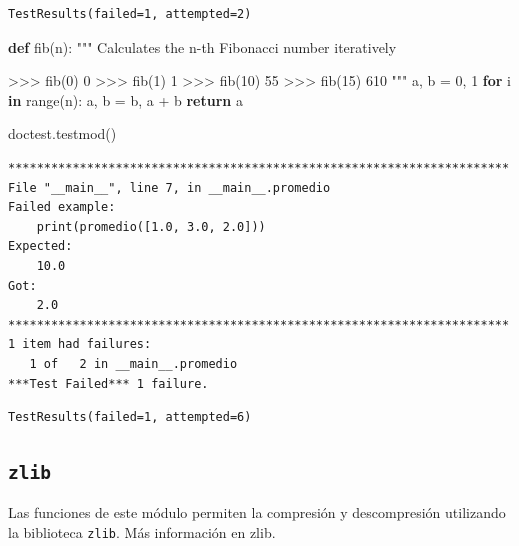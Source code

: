 \documentclass[
  spanish,
  letterpaper,
]{scrbook}
\newenvironment{Shaded}{\begin{snugshade}}{\end{snugshade}}
\newcommand{\BuiltInTok}[1]{\textcolor[rgb]{0.00,0.23,0.31}{#1}}
\newcommand{\CommentTok}[1]{\textcolor[rgb]{0.37,0.37,0.37}{#1}}
\newcommand{\ControlFlowTok}[1]{\textcolor[rgb]{0.00,0.23,0.31}{\textbf{#1}}}
\newcommand{\DecValTok}[1]{\textcolor[rgb]{0.68,0.00,0.00}{#1}}
\newcommand{\KeywordTok}[1]{\textcolor[rgb]{0.00,0.23,0.31}{\textbf{#1}}}
\newcommand{\NormalTok}[1]{\textcolor[rgb]{0.00,0.23,0.31}{#1}}
\newcommand{\OperatorTok}[1]{\textcolor[rgb]{0.37,0.37,0.37}{#1}}
\theoremstyle{definition}
\theoremstyle{remark}
\begin{document}
\begin{verbatim}
TestResults(failed=1, attempted=2)
\end{verbatim}

\begin{Shaded}
\begin{Highlighting}[]
\KeywordTok{def}\NormalTok{ fib(n):}
    \CommentTok{""" }
\CommentTok{    Calculates the n{-}th Fibonacci number iteratively  }

\CommentTok{    \textgreater{}\textgreater{}\textgreater{} fib(0)}
\CommentTok{    0}
\CommentTok{    \textgreater{}\textgreater{}\textgreater{} fib(1)}
\CommentTok{    1}
\CommentTok{    \textgreater{}\textgreater{}\textgreater{} fib(10) }
\CommentTok{    55}
\CommentTok{    \textgreater{}\textgreater{}\textgreater{} fib(15)}
\CommentTok{    610}
\CommentTok{    """}
\NormalTok{    a, b }\OperatorTok{=} \DecValTok{0}\NormalTok{, }\DecValTok{1}
    \ControlFlowTok{for}\NormalTok{ i }\KeywordTok{in} \BuiltInTok{range}\NormalTok{(n):}
\NormalTok{        a, b }\OperatorTok{=}\NormalTok{ b, a }\OperatorTok{+}\NormalTok{ b}
    \ControlFlowTok{return}\NormalTok{ a}
\end{Highlighting}
\end{Shaded}

\begin{Shaded}
\begin{Highlighting}[]
\NormalTok{doctest.testmod()}
\end{Highlighting}
\end{Shaded}

\begin{verbatim}
**********************************************************************
File "__main__", line 7, in __main__.promedio
Failed example:
    print(promedio([1.0, 3.0, 2.0]))
Expected:
    10.0    
Got:
    2.0
**********************************************************************
1 item had failures:
   1 of   2 in __main__.promedio
***Test Failed*** 1 failure.
\end{verbatim}

\begin{verbatim}
TestResults(failed=1, attempted=6)
\end{verbatim}

\subsection{\texorpdfstring{\texttt{zlib}}{zlib}}\label{zlib}

Las funciones de este módulo permiten la compresión y descompresión
utilizando la biblioteca \texttt{zlib}. Más información en zlib.
\end{document}
